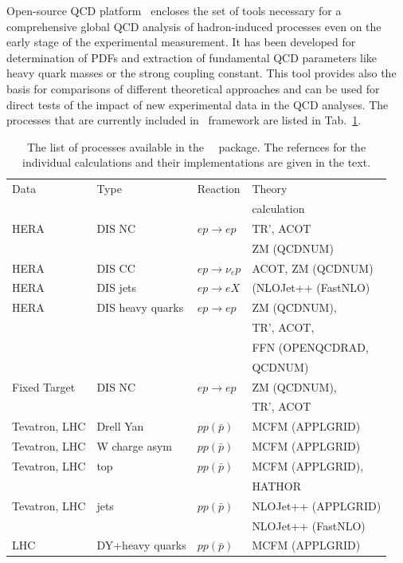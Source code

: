%
Open-source QCD platform \fitter\ encloses the set of tools  necessary for a comprehensive global 
QCD analysis of hadron-induced processes even on the early stage of the experimental measurement. 
It has been developed for determination of PDFs and extraction of fundamental QCD parameters like heavy
quark masses or the strong coupling constant. This tool provides also the basis for 
comparisons of different theoretical approaches and can be used for direct tests of the impact 
of new experimental data in the QCD analyses.
%
The processes that are currently included in \fitter~framework are listed in Tab.~\ref{tab:proc}.
%
\begin{table}
\small
\scriptsize

\begin{tabular}{|l|l|l|l|}
\hline
Data &Type &  Reaction & Theory      \\
        &     &     & calculation \\
\hline

HERA &DIS NC   &$ep\to ep$      & TR', ACOT \\
     &         &                & ZM (QCDNUM) \\
HERA &DIS CC   &$ep\to \nu_e p$ & ACOT, ZM (QCDNUM) \\
HERA &DIS jets &$ep\to eX$      & (NLOJet++ (FastNLO)\\
HERA &DIS heavy quarks          & $ep\to ep $& ZM (QCDNUM), \\
     &         &                & TR', ACOT, \\
     &         &                & FFN (OPENQCDRAD, \\
     &         &                & QCDNUM) \\
\hline
Fixed Target   &DIS NC          &$ep\to ep$ & ZM (QCDNUM), \\
     &         &                & TR', ACOT \\
\hline
Tevatron, LHC &Drell Yan &$pp(\bar p)$ & MCFM (APPLGRID) \\
Tevatron, LHC &W charge asym &$pp(\bar p)$ & MCFM (APPLGRID) \\
Tevatron, LHC &top &$pp(\bar p)$  & MCFM (APPLGRID),  \\
              &    &              & HATHOR \\
Tevatron, LHC &jets &$pp(\bar p)$ & NLOJet++ (APPLGRID) \\
                &  & & NLOJet++ (FastNLO) \\
LHC& DY+heavy quarks &$pp(\bar p)$ & MCFM (APPLGRID) \\
\hline
\end{tabular}
\caption{The list of processes available in the \fitter\ ~package. 
The refernces for the individual calculations and their implementations are given in the text.
}
\label{tab:proc}
\end{table}
